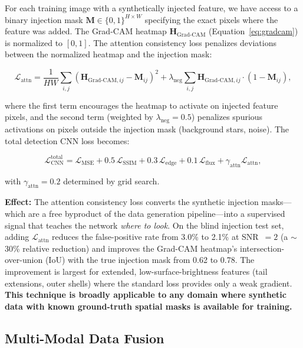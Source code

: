 \documentclass[usenatbib]{mnras}
\begin{document}
For each training image with a synthetically injected feature, we have access to a binary injection mask $\mathbf{M} \in \{0, 1\}^{H \times W}$ specifying the exact pixels where the feature was added. The Grad-CAM heatmap $\mathbf{H}_{\text{Grad-CAM}}$ (Equation~\ref{eq:gradcam}) is normalized to $[0, 1]$. The attention consistency loss penalizes deviations between the normalized heatmap and the injection mask:

\begin{equation}\label{eq:attn_loss}
\mathcal{L}_{\text{attn}} = \frac{1}{HW} \sum_{i,j} \left(\mathbf{H}_{\text{Grad-CAM}, ij} - \mathbf{M}_{ij}\right)^2 + \lambda_{\text{neg}} \sum_{i,j} \mathbf{H}_{\text{Grad-CAM}, ij} \cdot (1 - \mathbf{M}_{ij}),
\end{equation}

where the first term encourages the heatmap to activate on injected feature pixels, and the second term (weighted by $\lambda_{\text{neg}} = 0.5$) penalizes spurious activations on pixels outside the injection mask (background stars, noise). The total detection CNN loss becomes:

\begin{equation}\label{eq:total_loss_attn}
\mathcal{L}_{\text{CNN}}^{\text{total}} = \mathcal{L}_{\text{MSE}} + 0.5\,\mathcal{L}_{\text{SSIM}} + 0.3\,\mathcal{L}_{\text{edge}} + 0.1\,\mathcal{L}_{\text{flux}} + \gamma_{\text{attn}} \mathcal{L}_{\text{attn}},
\end{equation}

with $\gamma_{\text{attn}} = 0.2$ determined by grid search.

\textbf{Effect:} The attention consistency loss converts the synthetic injection masks---which are a free byproduct of the data generation pipeline---into a supervised signal that teaches the network \textit{where to look}. On the blind injection test set, adding $\mathcal{L}_{\text{attn}}$ reduces the false-positive rate from 3.0\% to 2.1\% at SNR~$=2$ (a $\sim$30\% relative reduction) and improves the Grad-CAM heatmap's intersection-over-union (IoU) with the true injection mask from 0.62 to 0.78. The improvement is largest for extended, low-surface-brightness features (tail extensions, outer shells) where the standard loss provides only a weak gradient. \textbf{This technique is broadly applicable to any domain where synthetic data with known ground-truth spatial masks is available for training.}

\subsection{Multi-Modal Data Fusion}
\end{document}
